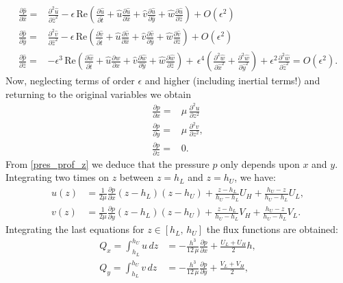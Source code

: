 \begin{align*}
\frac{\partial \hat{p}}{\partial \hat{x}}={}&\frac{\partial^2 \hat{u}}{\partial \hat{z}^2}-\epsilon\, \text{Re}\left( \frac{\partial \hat{u}}{\partial \hat{t}} +\hat{u}\frac{\partial\hat{u}}{\partial \hat{x}}+\hat{v}\frac{\partial\hat{u}}{\partial\hat{y}}+\hat{w}\frac{\partial\hat{u}}{\partial\hat{z}} \right)+O\left(\epsilon^2\right)\\
\frac{\partial \hat{p}}{\partial \hat{y}}={}&\frac{\partial^2 \hat{v}}{\partial \hat{z}^2}-\epsilon\, \text{Re}\left( \frac{\partial \hat{v}}{\partial \hat{t}} +\hat{u}\frac{\partial\hat{v}}{\partial \hat{x}}+\hat{v}\frac{\partial\hat{v}}{\partial\hat{y}}+\hat{w}\frac{\partial\hat{v}}{\partial\hat{z}} \right)+O\left(\epsilon^2\right)\\
\frac{\partial \hat{p}}{\partial \hat{z}}={}&-\epsilon^3\, \text{Re}\left( \frac{\partial \hat{w}}{\partial\hat{t}}+\hat{u}\frac{\partial\hat{w}}{\partial \hat{x}}+\hat{v}\frac{\partial\hat{w}}{\partial\hat{y}}+\hat{w}\frac{\partial\hat{w}}{\partial\hat{z}}  \right)+\,\epsilon^4\left( \frac{\partial^2 \hat{w}}{\partial\hat{x}^2}+\frac{\partial^2 \hat{w}}{\partial\hat{y}^2}\right)+\epsilon^2\frac{\partial^2\hat{w}}{\partial\hat{z}^2}=O\left(\epsilon^2\right).
\end{align*}
Now, neglecting terms of order $\epsilon$ and higher (including inertial terms!) and returning to the original variables we obtain
\begin{align}
\frac{\partial p}{\partial x}={}&\mu\,\frac{\partial^2 u}{\partial z^2}\label{eq:pres_prof_x}\\ 
\frac{\partial p}{\partial y}={}&\mu\,\frac{\partial^2 v}{\partial z^2},\label{eq:pres_prof_y}\\ 
\frac{\partial p}{\partial z}={}&0.\label{eq:pres_prof_z}
\end{align}
From \eqref{pres_prof_z} we deduce that the pressure $p$ only depends upon $x$ and $y$. Integrating two times on $z$ between $z=h_L$ and $z=h_U$, we have:
\begin{align}
u(z)&=\frac{1}{2\mu}\frac{\partial p}{\partial x} (z-h_L)(z-h_U)+\frac{z-h_L}{h_U-h_L}U_H+\frac{h_U-z}{h_U-h_L}U_L,\label{eq:u_profile}\\
v(z)&=\frac{1}{2\mu}\frac{\partial p}{\partial y} (z-h_L)(z-h_U)+\frac{z-h_L}{h_U-h_L}V_H+\frac{h_U-z}{h_U-h_L}V_L.\label{eq:v_profile}
\end{align}
Integrating the last equations for $z\in[h_L,\,h_U]$ the flux functions are obtained:
\begin{align}
Q_x=\int_{h_L}^{h_U}u\,dz&=-\frac{h^3}{12\,\mu}\frac{\partial p}{\partial x}+\frac{U_L+U_H}{2}h,\label{eq:reynolds_flux_x}\\
Q_y=\int_{h_L}^{h_U}v\,dz&=-\frac{h^3}{12\,\mu}\frac{\partial p}{\partial y}+\frac{V_L+V_H}{2},\label{eq:reynolds_flux_y}
\end{align}
